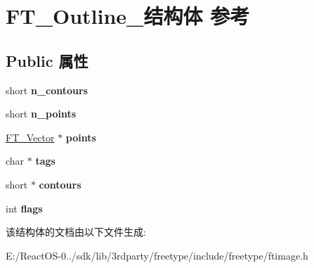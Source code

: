 \hypertarget{struct_f_t___outline__}{}\section{F\+T\+\_\+\+Outline\+\_\+结构体 参考}
\label{struct_f_t___outline__}
\subsection*{Public 属性}
\begin{DoxyCompactItemize}
\item 
\mbox{\label{struct_f_t___outline___a0313ba9c2c51f10e6b7d7ef97bd946e2}} 
short {\bfseries n\+\_\+contours}
\item 
\mbox{\label{struct_f_t___outline___a7ebcf3c33231af88655534d1ac02b66e}} 
short {\bfseries n\+\_\+points}
\item 
\mbox{\label{struct_f_t___outline___a4871896a2f38bdab947e30a7cf6bca04}} 
\hyperlink{struct_f_t___vector__}{F\+T\+\_\+\+Vector} $\ast$ {\bfseries points}
\item 
\mbox{\label{struct_f_t___outline___ac84ca66907361e1f49ec11c14720087a}} 
char $\ast$ {\bfseries tags}
\item 
\mbox{\label{struct_f_t___outline___a218fdea14003061142ac1045ac50affa}} 
short $\ast$ {\bfseries contours}
\item 
\mbox{\label{struct_f_t___outline___a149765f0be0eab4fc82410cf853964bf}} 
int {\bfseries flags}
\end{DoxyCompactItemize}


该结构体的文档由以下文件生成\+:\begin{DoxyCompactItemize}
\item 
E\+:/\+React\+O\+S-\/0../sdk/lib/3rdparty/freetype/include/freetype/ftimage.\+h\end{DoxyCompactItemize}
